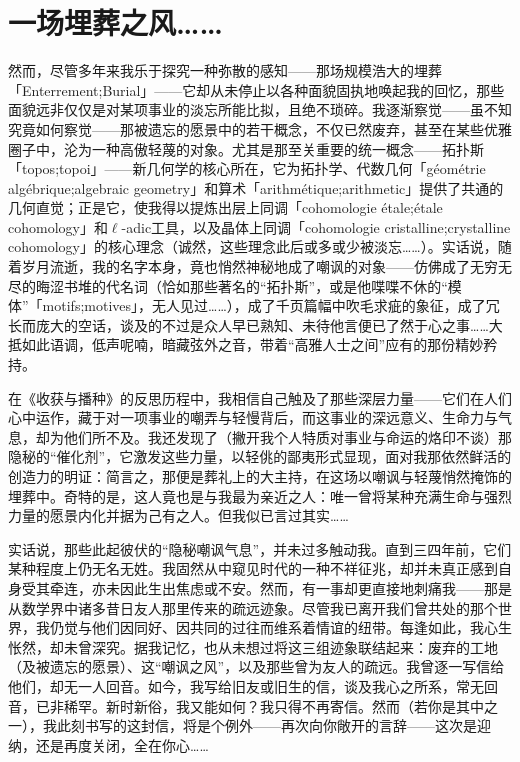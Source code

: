 \section{一场埋葬之风……}

然而，尽管多年来我乐于探究一种弥散的感知——那场规模浩大的埋葬「Enterrement;Burial」——它却从未停止以各种面貌固执地唤起我的回忆，那些面貌远非仅仅是对某项事业的淡忘所能比拟，且绝不琐碎。我逐渐察觉——虽不知究竟如何察觉——那被遗忘的愿景中的若干概念，不仅已然废弃，甚至在某些优雅圈子中，沦为一种高傲轻蔑的对象。尤其是那至关重要的统一概念——拓扑斯「topos;topoi」——新几何学的核心所在，它为拓扑学、代数几何「géométrie algébrique;algebraic geometry」和算术「arithmétique;arithmetic」提供了共通的几何直觉；正是它，使我得以提炼出层上同调「cohomologie étale;étale cohomology」和$\ell$-adic工具，以及晶体上同调「cohomologie cristalline;crystalline cohomology」的核心理念（诚然，这些理念此后或多或少被淡忘……）。实话说，随着岁月流逝，我的名字本身，竟也悄然神秘地成了嘲讽的对象——仿佛成了无穷无尽的晦涩书堆的代名词（恰如那些著名的``拓扑斯''，或是他喋喋不休的``模体''「motifs;motives」，无人见过……），成了千页篇幅中吹毛求疵的象征，成了冗长而庞大的空话，谈及的不过是众人早已熟知、未待他言便已了然于心之事……大抵如此语调，低声呢喃，暗藏弦外之音，带着“高雅人士之间”应有的那份精妙矜持。

在《收获与播种》的反思历程中，我相信自己触及了那些深层力量——它们在人们心中运作，藏于对一项事业的嘲弄与轻慢背后，而这事业的深远意义、生命力与气息，却为他们所不及。我还发现了（撇开我个人特质对事业与命运的烙印不谈）那隐秘的``催化剂''，它激发这些力量，以轻佻的鄙夷形式显现，面对我那依然鲜活的创造力的明证：简言之，那便是葬礼上的大主持，在这场以嘲讽与轻蔑悄然掩饰的埋葬中。奇特的是，这人竟也是与我最为亲近之人：唯一曾将某种充满生命与强烈力量的愿景内化并据为己有之人。但我似已言过其实……

实话说，那些此起彼伏的``隐秘嘲讽气息''，并未过多触动我。直到三四年前，它们某种程度上仍无名无姓。我固然从中窥见时代的一种不祥征兆，却并未真正感到自身受其牵连，亦未因此生出焦虑或不安。然而，有一事却更直接地刺痛我——那是从数学界中诸多昔日友人那里传来的疏远迹象。尽管我已离开我们曾共处的那个世界，我仍觉与他们因同好、因共同的过往而维系着情谊的纽带。每逢如此，我心生怅然，却未曾深究。据我记忆，也从未想过将这三组迹象联结起来：废弃的工地（及被遗忘的愿景）、这``嘲讽之风''，以及那些曾为友人的疏远。我曾逐一写信给他们，却无一人回音。如今，我写给旧友或旧生的信，谈及我心之所系，常无回音，已非稀罕。新时新俗，我又能如何？我只得不再寄信。然而（若你是其中之一），我此刻书写的这封信，将是个例外——再次向你敞开的言辞——这次是迎纳，还是再度关闭，全在你心……

